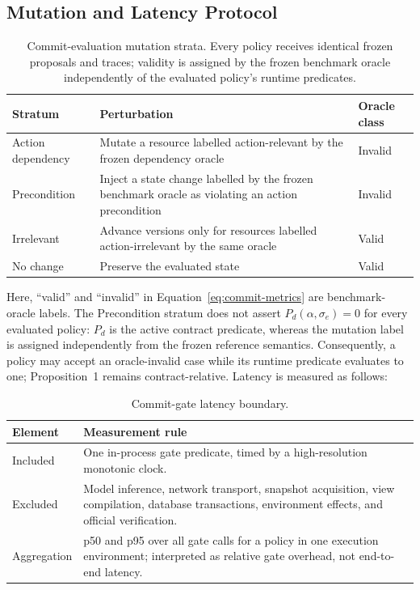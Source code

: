 \subsection{Mutation and Latency Protocol}
\begin{table}[H]
\centering
\normalsize
\renewcommand{\arraystretch}{1.14}
\caption{Commit-evaluation mutation strata. Every policy receives identical frozen proposals and traces; validity is assigned by the frozen benchmark oracle independently of the evaluated policy's runtime predicates.}
\begin{tabularx}{0.94\textwidth}{@{}p{} X p{}@{}}
\toprule
\textbf{Stratum} & \textbf{Perturbation} & \textbf{Oracle class} \\
\midrule
Action dependency & Mutate a resource labelled action-relevant by the frozen dependency oracle & Invalid \\
Precondition & Inject a state change labelled by the frozen benchmark oracle as violating an action precondition & Invalid \\
Irrelevant & Advance versions only for resources labelled action-irrelevant by the same oracle & Valid \\
No change & Preserve the evaluated state & Valid \\
\bottomrule
\end{tabularx}
\end{table}
Here, ``valid'' and ``invalid'' in Equation~\eqref{eq:commit-metrics} are benchmark-oracle labels. The Precondition stratum does not assert $P_d(\alpha,\sigma_e)=0$ for every evaluated policy: $P_d$ is the active contract predicate, whereas the mutation label is assigned independently from the frozen reference semantics. Consequently, a policy may accept an oracle-invalid case while its runtime predicate evaluates to one; Proposition~1 remains contract-relative. Latency is measured as follows:
\begin{table}[H]
\centering
\normalsize
\renewcommand{\arraystretch}{1.14}
\caption{Commit-gate latency boundary.}
\begin{tabularx}{0.94\textwidth}{@{}p{} X@{}}
\toprule
\textbf{Element} & \textbf{Measurement rule} \\
\midrule
Included & One in-process gate predicate, timed by a high-resolution monotonic clock. \\
Excluded & Model inference, network transport, snapshot acquisition, view compilation, database transactions, environment effects, and official verification. \\
Aggregation & p50 and p95 over all gate calls for a policy in one execution environment; interpreted as relative gate overhead, not end-to-end latency. \\
\bottomrule
\end{tabularx}
\end{table}

